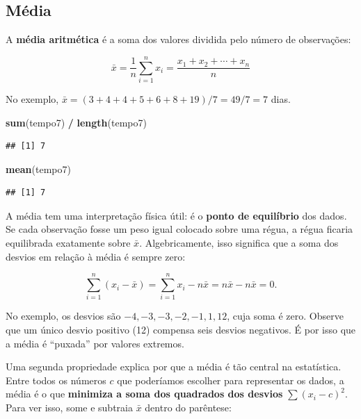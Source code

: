 \documentclass[
]{book}
\newenvironment{Shaded}{\begin{snugshade}}{\end{snugshade}}
\newcommand{\FunctionTok}[1]{\textcolor[rgb]{0.13,0.29,0.53}{\textbf{#1}}}
\newcommand{\NormalTok}[1]{#1}
\newcommand{\SpecialCharTok}[1]{\textcolor[rgb]{0.81,0.36,0.00}{\textbf{#1}}}
\begin{document}
\subsection{Média}\label{muxe9dia}

A \textbf{média aritmética} é a soma dos valores dividida pelo número de observações:

\begin{equation}
\bar{x} = \frac{1}{n}\sum_{i=1}^{n} x_i = \frac{x_1 + x_2 + \cdots + x_n}{n}
\label{eq:media}
\end{equation}

No exemplo, \(\bar{x} = (3 + 4 + 4 + 5 + 6 + 8 + 19)/7 = 49/7 = 7\) dias.

\begin{Shaded}
\begin{Highlighting}[]
\FunctionTok{sum}\NormalTok{(tempo7) }\SpecialCharTok{/} \FunctionTok{length}\NormalTok{(tempo7)}
\end{Highlighting}
\end{Shaded}

\begin{verbatim}
## [1] 7
\end{verbatim}

\begin{Shaded}
\begin{Highlighting}[]
\FunctionTok{mean}\NormalTok{(tempo7)}
\end{Highlighting}
\end{Shaded}

\begin{verbatim}
## [1] 7
\end{verbatim}

A média tem uma interpretação física útil: é o \textbf{ponto de equilíbrio} dos dados. Se cada observação fosse um peso igual colocado sobre uma régua, a régua ficaria equilibrada exatamente sobre \(\bar{x}\). Algebricamente, isso significa que a soma dos desvios em relação à média é sempre zero:

\[
\sum_{i=1}^{n}(x_i - \bar{x}) = \sum_{i=1}^{n} x_i - n\bar{x} = n\bar{x} - n\bar{x} = 0.
\]

No exemplo, os desvios são \(-4, -3, -3, -2, -1, 1, 12\), cuja soma é zero. Observe que um único desvio positivo (12) compensa seis desvios negativos. É por isso que a média é ``puxada'' por valores extremos.

Uma segunda propriedade explica por que a média é tão central na estatística. Entre todos os números \(c\) que poderíamos escolher para representar os dados, a média é o que \textbf{minimiza a soma dos quadrados dos desvios} \(\sum (x_i - c)^2\). Para ver isso, some e subtraia \(\bar{x}\) dentro do parêntese:
\end{document}
